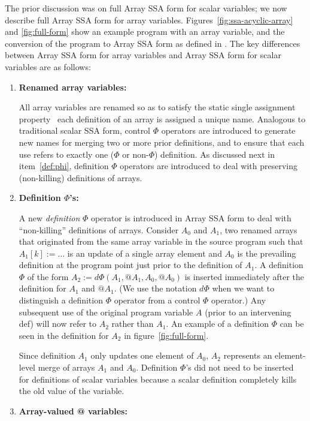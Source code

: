 The prior discussion was on full Array SSA form for scalar variables;
we now describe full Array SSA form for array variables.
Figures~\ref{fig:ssa-acyclic-array} and \ref{fig:full-form}
show an example program with an
array variable, and the conversion of the program to Array SSA form as
defined in \cite{KnSa98}.  The key differences between Array SSA form
for array variables and Array SSA form for scalar variables are as
follows:
\begin{enumerate}
\item {\bf Renamed array variables:}

All array variables are renamed so as to 
satisfy the static single assignment property \ie\ each
definition of an array is assigned a unique name.  Analogous to traditional scalar SSA
form, control $\Phi$ operators are introduced to generate new names
for merging two or more prior definitions, and to ensure that each use
refers to exactly one ($\Phi$ or non-$\Phi$) definition.
As discussed next in item~\ref{def:phi}, definition $\Phi$ operators are introduced to deal with preserving (non-killing) definitions of arrays.

\item {\bf Definition $\Phi$'s:}
\label{def:phi}


A new {\it definition} $\Phi$ operator is 
introduced in Array SSA form to deal with ``non-killing'' definitions
of arrays.  Consider $A_0$ and $A_1$, two renamed 
arrays that originated from the same array variable in the source program
such that $A_1[k] := \ldots$
is an update of a single array element
and $A_0$ is the prevailing definition at the program point just
prior to the definition of $A_1$.
A definition $\Phi$ of the form $A_2 := d\Phi(A_1, @A_1, A_0, @A_0)$ 
is inserted immediately after the definition for $A_1$ and $@A_1$.
(We use the notation $d\Phi$ when we want to 
distinguish a definition $\Phi$ operator from a control $\Phi$ operator.)
Any subsequent use of the original program
variable $A$ (prior to an
intervening def) will now refer to $A_2$ rather than $A_1$.  
An example of a definition $\Phi$ can be seen in the definition for
$A_2$ in figure~\ref{fig:full-form}.

Since definition $A_1$ only updates one element of $A_0$, $A_2$ represents
an element-level merge of arrays $A_1$ and $A_0$.
Definition $\Phi$'s did not need to be
inserted for definitions of scalar variables because a scalar definition completely kills the old value of
the variable.  

\item {\bf Array-valued @ variables:}


\end{enumerate}
